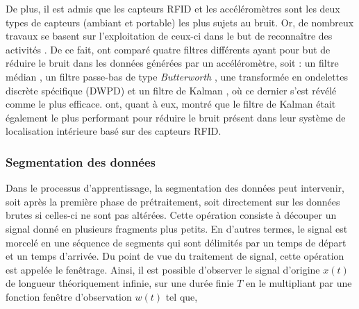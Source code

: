 De plus, il est admis que les capteurs \ac{RFID} et les accéléromètres sont les deux types de capteurs (ambiant et portable) les plus sujets au bruit. Or, de nombreux travaux se basent sur l'exploitation de ceux-ci dans le but de reconnaître des activités \citep{Ravi2005, Stikic2008, Buettner2009, Khan2011, Mannini2017}. De ce fait, \cite{Wang2011} ont comparé quatre filtres différents ayant pour but de réduire le bruit dans les données générées par un accéléromètre, soit : un filtre médian \citep{Huang1979}, un filtre passe-bas de type \textit{Butterworth} \citep{Butterworth1930}, une transformée en ondelettes discrète spécifique (\ac{DWPD}) \citep{Mallat1989} et un filtre de Kalman \citep{Welch2006}, où ce dernier s'est révélé comme le plus efficace. \cite{Abreu2014} ont, quant à eux, montré que le filtre de Kalman était également le plus performant pour réduire le bruit présent dans leur système de localisation intérieure basé sur des capteurs \acs{RFID}.

\subsubsection{Segmentation des données}



Dans le processus d'apprentissage, la segmentation des données peut intervenir, soit après la première phase de prétraitement, soit directement sur les données brutes si celles-ci ne sont pas altérées. Cette opération consiste à découper un signal donné en plusieurs fragments plus petits. En d'autres termes, le signal est morcelé en une séquence de segments qui sont délimités par un temps de départ et un temps d'arrivée. Du point de vue du traitement de signal, cette opération est appelée le fenêtrage. Ainsi, il est possible d'observer le signal d'origine $x\left(t\right)$ de longueur théoriquement infinie, sur une durée finie $T$ en le multipliant par une fonction fenêtre d'observation $w\left(t\right)$ tel que,

